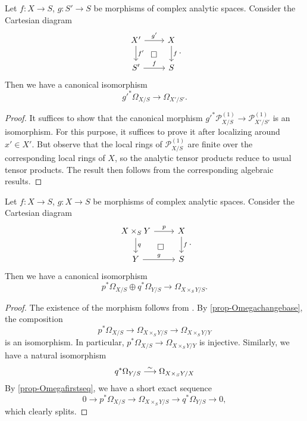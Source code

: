\begin{proposition}\label{prop-Omegachangebase}
    Let $f:X\rightarrow S$, $g:S'\rightarrow S$ be morphisms of complex analytic spaces. Consider the Cartesian diagram
    \[
        \begin{tikzcd}
            X' \arrow[r, "g'"] \arrow[d, "f'"] \arrow[rd, "\square", phantom] & X \arrow[d, "f"] \\
            S' \arrow[r, "f"]                                                 & S               
        \end{tikzcd}.  
    \]
    Then we have a canonical isomorphism
    \[
        g'^*\Omega_{X/S}\rightarrow \Omega_{X'/S'}.  
    \]
\end{proposition}
\begin{proof}
    It suffices to show that the canonical morphism $g'^*\mathcal{P}^{(1)}_{X/S}\rightarrow \mathcal{P}^{(1)}_{X'/S'}$ is an isomorphism. For this purpose, it suffices to prove it after localizing around $x'\in X'$. But observe that the local rings of $\mathcal{P}^{(1)}_{X/S}$ are finite over the corresponding local rings of $X$, so the analytic tensor products reduce to usual tensor products. The result then follows from the corresponding algebraic results.
\end{proof}

\begin{corollary}\label{cor-Omega1sum}
    Let $f:X\rightarrow S$, $g:X\rightarrow S$ be morphisms of complex analytic spaces. Consider the Cartesian diagram
    \[
        \begin{tikzcd}
            X\times_S Y \arrow[r, "p"] \arrow[d, "q"] \arrow[rd, "\square", phantom] & X \arrow[d, "f"] \\
            Y \arrow[r, "g"]                                                         & S               
        \end{tikzcd}.  
    \]
    Then we  have a canonical isomorphism
    \[
        p^*\Omega_{X/S}\oplus q^*\Omega_{Y/S}\rightarrow \Omega_{X\times_S Y/S}.  
    \]
\end{corollary}
\begin{proof}
    The existence of the morphism follows from \cite[\href{https://stacks.math.columbia.edu/tag/08RU}{Tag 08RU}]{stacks-project}. By \cref{prop-Omegachangebase}, the composition 
    \[
        p^*\Omega_{X/S}\rightarrow \Omega_{X\times_S Y/S}\rightarrow \Omega_{X\times_S Y/Y}  
    \]
    is an isomorphism. In particular, $p^*\Omega_{X/S}\rightarrow \Omega_{X\times_S Y/Y}$ is injective. Similarly, we have a natural isomorphism
    \[
          q^*\Omega_{Y/S}\stackrel{\sim}{\longrightarrow} \Omega_{X\times_S Y/X}  
    \]
    By \cref{prop-Omegafirstseq}, we have a short exact sequence
    \[
        0\rightarrow p^*\Omega_{X/S}\rightarrow \Omega_{X\times_S Y/S} \rightarrow q^*\Omega_{Y/S}\rightarrow 0, 
    \]
    which clearly splits.
\end{proof}


